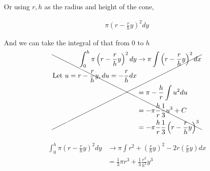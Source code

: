 \documentclass[letterpaper]{article}
\begin{document}
Or using \(r, h\) as the radius and height of the cone,

\[\begin{aligned}
   \pi  \left(r-\frac{r}{h}y \right)  ^2 dy
  \end{aligned}\]

And we can take the integral of that from \(0\) to \(h\)

\[\xcancel{\begin{aligned}
  \int_{0}^{h}  \pi  \left(r-\frac{r}{h}y \right)  ^2 dy &\to \pi  \int \left(r - \frac{r}{h}y \right)  ^2 dx \\
  \text{Let } u = r-\frac{r}{h}y, du = -\frac{r}{h} dx\\
  &= \pi -\frac{h}{r} \int u ^2 du\\
  &= -\pi \frac{h}{r} \frac{1}{3}u^3 +C\\
  &= -\pi \frac{h}{r} \frac{1}{3} \left(r-\frac{r}{h}y \right)  ^3
  \end{aligned}}\]


\[\begin{aligned}
  \int_{0}^{h}  \pi  \left(r-\frac{r}{h}y \right)  ^2 dy &\to \pi  \int r^2 +   \left(\frac{r}{h}y \right)  ^2 - 2 r  \left(\frac{r}{h}y \right)  dx \\
  &= \frac{1}{3} \pi r^3 + \frac{1}{3}\frac{r^2}{h^2}y^3
  \end{aligned}\]
\end{document}
